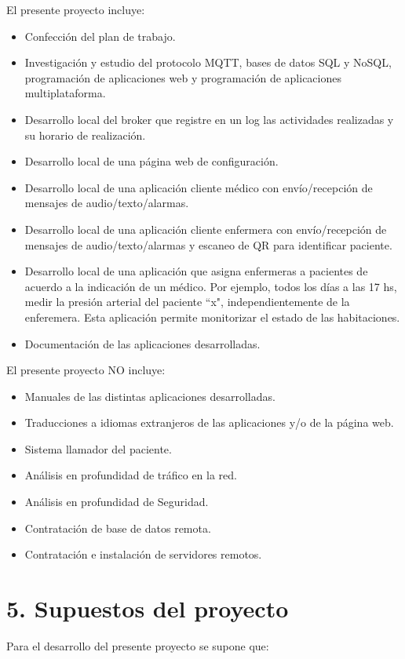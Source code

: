 \documentclass[
11pt, %
]{charter}
\begin{document}
El presente proyecto incluye:

\begin{itemize}
	\item Confección del plan de trabajo. 
	\item Investigación y estudio del protocolo MQTT, bases de datos SQL y NoSQL, programación de aplicaciones web y programación de aplicaciones multiplataforma.	
	\item Desarrollo local del broker que registre en un log las actividades realizadas y su horario de realización. 
	\item Desarrollo local de una página web de configuración.
	\item Desarrollo local de una aplicación cliente médico con envío/recepción de mensajes de audio/texto/alarmas.
	\item Desarrollo local de una aplicación cliente enfermera con envío/recepción de mensajes de audio/texto/alarmas y escaneo de QR para identificar paciente. 
	\item Desarrollo local de una aplicación que asigna enfermeras a pacientes de acuerdo a la indicación de un médico. Por ejemplo, todos los días a las 17 hs, medir la presión arterial del paciente ``x", independientemente de la enferemera. Esta aplicación permite monitorizar el estado de las habitaciones.
	\item Documentación de las aplicaciones desarrolladas.

\end{itemize}

El presente proyecto NO incluye:
\begin{itemize}
	\item Manuales de las distintas aplicaciones desarrolladas.
	\item Traducciones a idiomas extranjeros de las aplicaciones y/o de la página web.
	\item Sistema llamador del paciente.
	\item Análisis en profundidad de tráfico en la red.
	\item Análisis en profundidad de Seguridad.
	\item Contratación de base de datos remota.
	\item Contratación e instalación de servidores remotos.
\end{itemize}



\section{5. Supuestos del proyecto}
\label{sec:supuestos}
Para el desarrollo del presente proyecto se supone que: 
\end{document}
